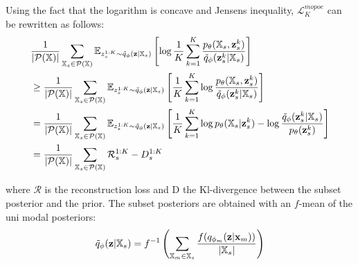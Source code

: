 Using the fact that the logarithm is concave and Jensens inequality, $\mathcal{L}^{mopoe}_K$ can be rewritten as follows:
\begin{equation}
    \begin{split}
        &\frac{1}{|\powerset|} \sum _{\xsubset \in \powerset} \mathbb{E}_{z^{1:K}_s \sim \subsetpost} \left[ \log \frac{1}{K} \sum _{k=1}^K \frac{p_{\theta}(\xsubset, \textbf{z}^k _s)}{\tilde{q}_{\phi}(\textbf{z}^k _s|\xsubset)} \right]\\
%
        &\geq \frac{1}{|\powerset|} \sum _{\xsubset \in \powerset} \mathbb{E}_{z^{1:K}_s \sim \subsetpost} \left[ \frac{1}{K} \sum _{k=1}^K \log  \frac{p_{\theta}(\xsubset, \textbf{z}^k _s)}{\tilde{q}_{\phi}(\textbf{z}^k _s|\xsubset)} \right]\\
%
        &= \frac{1}{|\powerset|} \sum _{\xsubset \in \powerset} \mathbb{E}_{z^{1:K}_s \sim \subsetpost} \left[ \frac{1}{K} \sum _{k=1}^K \log p_\theta (\xsubset|\textbf{z}^k _s) -\log  \frac{\tilde{q}_{\phi}(\textbf{z}^k _s|\xsubset)}{p_{\theta}(\textbf{z}^k _s)} \right]\\
%
        &= \frac{1}{|\powerset|} \sum _{\xsubset \in \powerset} \mathcal{R}^{1:K}_s - D^{1:K}_s
    \end{split}
\end{equation}

where $\mathcal{R}$ is the reconstruction loss and D the Kl-divergence between the subset posterior and the prior.
The subset posteriors are obtained with an $f$-mean of the uni modal posteriors:
\begin{equation}
    \tilde{q}_{\phi}(\textbf{z}|\mathbb{X}_s) = f^{-1}\left(\sum _{\mathbb{X}_m \in \mathbb{X}_s} \frac{f(q_{\phi_m}(\textbf{z}|\textbf{x}_m))}{|\mathbb{X}_s|}\right)
\end{equation}

